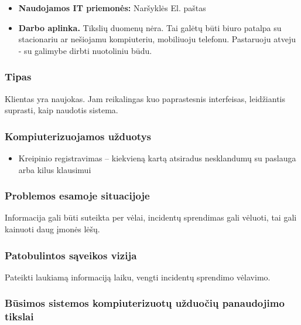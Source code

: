 		\begin{itemize}
			\item \textbf{Naudojamos IT priemonės:}
				\subitem Naršyklės
				\subitem El. paštas
			\item \textbf{Darbo aplinka.} Tikslių duomenų nėra. 
			Tai galėtų būti biuro patalpa su stacionariu ar nešiojamu kompiuteriu, mobiliuoju telefonu.
			Pastaruoju atveju - su galimybe dirbti nuotoliniu būdu.
		\end{itemize}
			
		\subsubsection{Tipas}
		
		Klientas yra naujokas. Jam reikalingas kuo paprastesnis interfeisas, leidžiantis suprasti, kaip naudotis sistema.
		
		\subsubsection{Kompiuterizuojamos užduotys}
		
		\begin{itemize}
			\item Kreipinio registravimas – kiekvieną kartą atsiradus nesklandumų su paslauga arba kilus klausimui
		\end{itemize}
		
		\subsubsection{Problemos esamoje situacijoje}
		
		Informacija gali būti suteikta per vėlai, incidentų sprendimas gali vėluoti, tai gali kainuoti daug įmonės lėšų.
		
		\subsubsection{Patobulintos sąveikos vizija}
		
		Pateikti laukiamą informaciją laiku, vengti incidentų sprendimo vėlavimo.
		
		\subsubsection{Būsimos sistemos kompiuterizuotų užduočių panaudojimo tikslai}
		
			\setcounter{tocdepth}{5} \setcounter{secnumdepth}{5}
			
